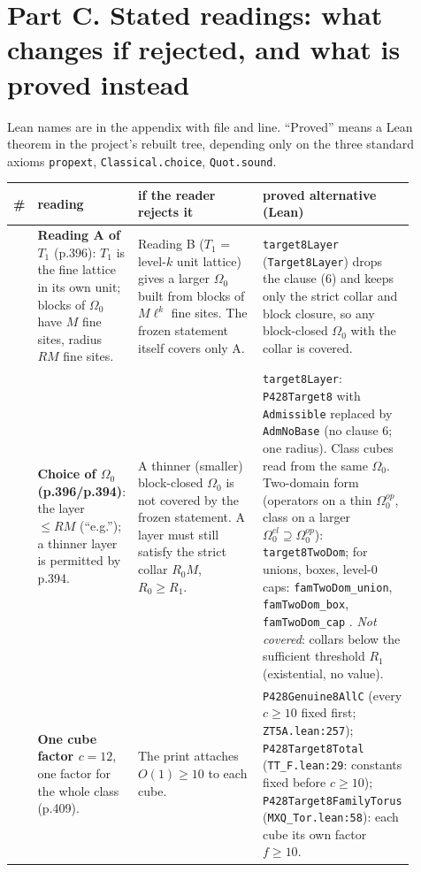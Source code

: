 \documentclass[10pt,a4paper]{article}
\begin{document}
\section*{Part C. Stated readings: what changes if rejected, and what is proved instead}
Lean names are in the appendix with file and line. ``Proved'' means a Lean theorem in the project's rebuilt tree, depending only on the three standard axioms \texttt{propext}, \texttt{Classical.choice}, \texttt{Quot.sound}.

\begin{longtable}{@{}>{\raggedright\arraybackslash}p{0.03\linewidth}>{\raggedright\arraybackslash}p{0.19\linewidth}>{\raggedright\arraybackslash}p{0.33\linewidth}>{\raggedright\arraybackslash}p{0.35\linewidth}@{}}
\toprule
\# & reading & if the reader rejects it & proved alternative (Lean) \\\midrule\endhead
1 & \textbf{Reading A of $T_1$} (p.396): $T_1$ is the fine lattice in its own unit; blocks of $\Omega_0$ have $M$ fine sites, radius $RM$ fine sites. & Reading B ($T_1$ = level-$k$ unit lattice) gives a larger $\Omega_0$ built from blocks of $M\ell^k$ fine sites. The frozen statement itself covers only A. & \texttt{target8Layer} (\texttt{Target8Layer}) drops the clause (6) and keeps only the strict collar and block closure, so any block-closed $\Omega_0$ with the collar is covered. \\
2 & \textbf{Choice of $\Omega_0$ (p.396/p.394)}: the layer $\le RM$ (``e.g.''); a thinner layer is permitted by p.394. & A thinner (smaller) block-closed $\Omega_0$ is not covered by the frozen statement. A layer must still satisfy the strict collar $R_0M$, $R_0\ge R_1$. & \texttt{target8Layer}: \texttt{P428Target8} with \texttt{Admissible} replaced by \texttt{AdmNoBase} (no clause 6; one radius). Class cubes read from the same $\Omega_0$. Two-domain form (operators on a thin $\Omega_0^{op}$, class on a larger $\Omega_0^{cl}\supseteq\Omega_0^{op}$): \texttt{target8TwoDom}; for unions, boxes, level-0 caps: \texttt{famTwoDom\_union}, \texttt{famTwoDom\_box}, \texttt{famTwoDom\_cap} . \emph{Not covered}: collars below the sufficient threshold $R_1$ (existential, no value). \\
3 & \textbf{One cube factor $c=12$}, one factor for the whole class (p.409). & The print attaches $O(1)\ge10$ to each cube. & \texttt{P428Genuine8AllC} (every $c\ge10$ fixed first; \texttt{ZT5A.lean:257}); \texttt{P428Target8Total} (\texttt{TT\_F.lean:29}: constants fixed before $c\ge10$); \texttt{P428Target8FamilyTorus} (\texttt{MXQ\_Tor.lean:58}): each cube its own factor $f\ge10$. \\

\end{longtable}
\end{document}
